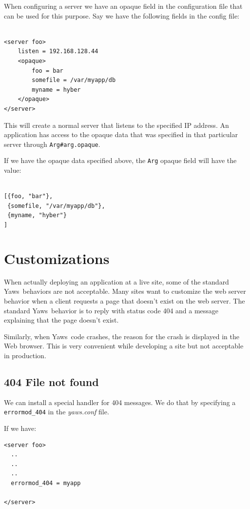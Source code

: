\documentclass[11pt,oneside,english]{book}
\newcommand{\Yaws}            %
        {{\sc Yaws}}
\begin{document}
When configuring a server we have an opaque field in the configuration
file that can be used for this purpose.  Say we have the following
fields in the config file:

\begin{verbatim}

<server foo>
    listen = 192.168.128.44
    <opaque>
        foo = bar
        somefile = /var/myapp/db
        myname = hyber
    </opaque>
</server>
\end{verbatim}

This will create a normal server that listens to the specified IP address.
An application has access to the opaque data that was specified
in that particular server through \verb+Arg#arg.opaque+.

If we have the opaque data specified above, the \verb+Arg+ opaque
field will have the value:

\begin{verbatim}

[{foo, "bar"},
 {somefile, "/var/myapp/db"},
 {myname, "hyber"}
]

\end{verbatim}


\section{Customizations}

When actually deploying an application at a live site, some of the
standard \Yaws\ behaviors are not acceptable. Many sites want to
customize the web server behavior when a client requests a page that
doesn't exist on the web server. The standard \Yaws\ behavior is to
reply with status code 404 and a message explaining that the page
doesn't exist.

Similarly, when \Yaws\  code crashes, the reason for the crash is
displayed in the Web browser. This is very convenient while
developing a site but not acceptable in production.


\subsection{404 File not found}

We can install a special handler for 404 messages. We do that by
specifying a \verb+errormod_404+ in the \textit{yaws.conf} file.

If we have:

\begin{verbatim}
<server foo>
  ..
  ..
  ..
  errormod_404 = myapp

</server>

\end{verbatim}
\end{document}

